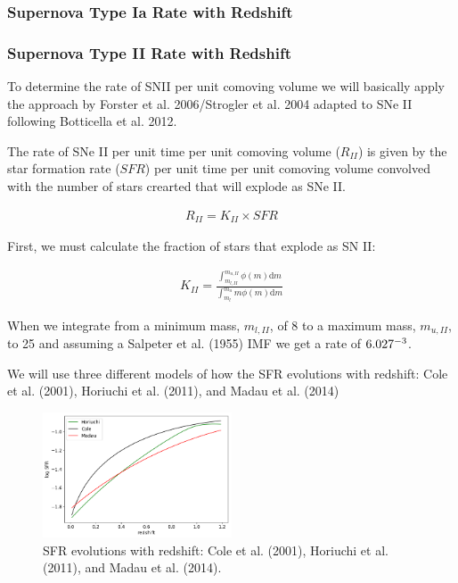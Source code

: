 \documentclass[12pt, onecolumn]{emulateapj}
\begin{document}
\subsubsection{Supernova Type Ia Rate with Redshift}
\label{sec:TypeIaRate}

\subsubsection{Supernova Type II Rate with Redshift}
\label{sec:TypeIIRate}

To determine the rate of SNII per unit comoving volume we will basically apply the approach by Forster et al. 2006/Strogler et al. 2004 adapted to SNe II following Botticella et al. 2012.

The rate of SNe II per unit time per unit comoving volume ($R_{II}$) is given by the star formation rate ($SFR$) per unit time per unit comoving volume convolved with the number of stars crearted that will explode as SNe II.

\begin{align}
	\label{eq:rateII}
	R_{II} = K_{II} \times SFR
\end{align}

First, we must calculate the fraction of stars that explode as SN II:

\begin{align}
\label{eq:rateII}
K_{II} = \frac{\int_{m_{l,II}}^{m_{u,II}} \phi(m) \mathrm{d}m}{\int_{m_{l}}^{m_{u}} m\phi(m) \mathrm{d}m}
\end{align}

When we integrate from a minimum mass, $m_{l,II}$, of 8 to a maximum mass, $m_{u,II}$, to 25 and assuming a Salpeter et al. (1955) IMF we get a rate of $6.027 \time 10^{-3}$.

We will use three different models of how the SFR evolutions with redshift: Cole et al. (2001), Horiuchi et al. (2011), and Madau et al. (2014)

\begin{figure}
	\begin{center}
		\includegraphics[width=0.5\textwidth]{SNII_SFR.png}
		\caption{SFR evolutions with redshift: Cole et al. (2001), Horiuchi et al. (2011), and Madau et al. (2014).}
		\label{fig:SNII_SFR}
	\end{center}
\end{figure}
\end{document}
